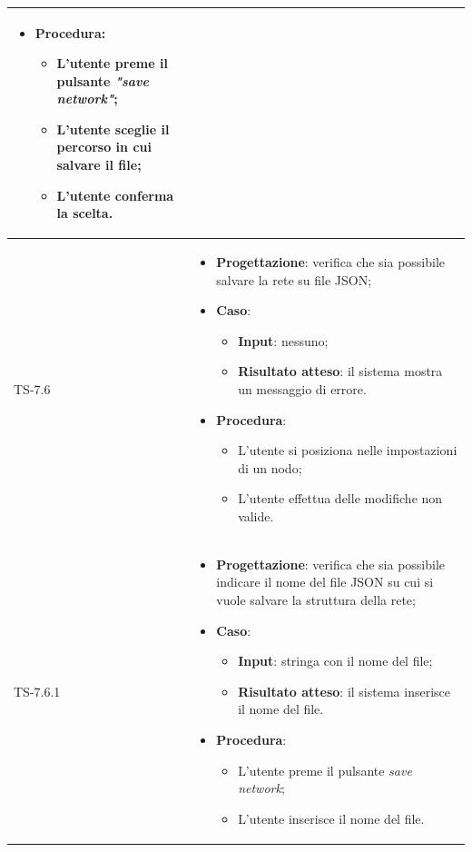 \begin{longtable}{|C{2.5cm}|C{13cm}|}
\begin{itemize}
\begin{itemize}
	\end{itemize}
	\item \textbf{Procedura}:
	\begin{itemize}
		\item L'utente preme il pulsante \emph{"save network"};
		\item L'utente sceglie il percorso in cui salvare il file;
		\item L'utente conferma la scelta.
	\end{itemize} 
\end{itemize} \\
\hline
	{TS-7.6} & 
\begin{itemize}
	\item \textbf{Progettazione}: verifica che sia possibile salvare la rete su
	file JSON;
	\item \textbf{Caso}: 
	\begin{itemize}
		\item \textbf{Input}: nessuno;
		\item \textbf{Risultato atteso}: il sistema mostra un messaggio di errore.
	\end{itemize}
	\item \textbf{Procedura}:
	\begin{itemize}
		\item L'utente si posiziona nelle impostazioni di un nodo;
		\item L'utente effettua delle modifiche non valide.
	\end{itemize} 
\end{itemize} \\
\hline
	{TS-7.6.1} & 
\begin{itemize}
	\item \textbf{Progettazione}: verifica che sia possibile indicare il nome
	del file JSON su cui si vuole salvare la struttura della rete;
	\item \textbf{Caso}: 
	\begin{itemize}
		\item \textbf{Input}: stringa con il nome del file;
		\item \textbf{Risultato atteso}: il  sistema inserisce il nome del file.
	\end{itemize}
	\item \textbf{Procedura}:
	\begin{itemize}
		\item L'utente preme il pulsante \emph{save network};
		\item L'utente inserisce il nome del file.
	\end{itemize} 

\end{itemize}
\end{longtable}
